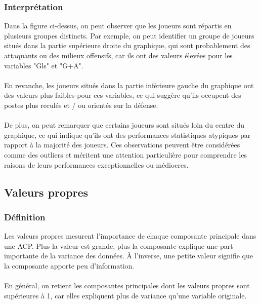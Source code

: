 \documentclass[11pt]{scrartcl}
\begin{document}
            \subsubsection{Interprétation}
                Dans la figure ci-dessus, on peut observer que les joueurs sont répartis en plusieurs groupes distincts. Par exemple, on peut identifier un groupe de joueurs situés dans la partie supérieure droite du graphique, qui sont probablement des attaquants ou des milieux offensifs, car ils ont des valeurs élevées pour les variables "Gls" et "G+A".\\\\
                En revanche, les joueurs situés dans la partie inférieure gauche du graphique ont des valeurs plus faibles pour ces variables, ce qui suggère qu'ils occupent des postes plus reculés et / ou orientés sur la défense.\\\\
                De plus, on peut remarquer que certains joueurs sont situés loin du centre du graphique, ce qui indique qu'ils ont des performances statistiques atypiques par rapport à la majorité des joueurs. Ces observations peuvent être considérées comme des outliers et méritent une attention particulière pour comprendre les raisons de leurs performances exceptionnelles ou médiocres.\\



        \subsection{Valeurs propres}
            \subsubsection{Définition}

                Les valeurs propres mesurent l’importance de chaque composante principale dans une ACP. Plus la valeur est grande, plus la composante explique une part importante de la variance des données. À l’inverse, une petite valeur signifie que la composante apporte peu d’information.\\\\
                En général, on retient les composantes principales dont les valeurs propres sont supérieures à 1, car elles expliquent plus de variance qu’une variable originale.
\end{document}
